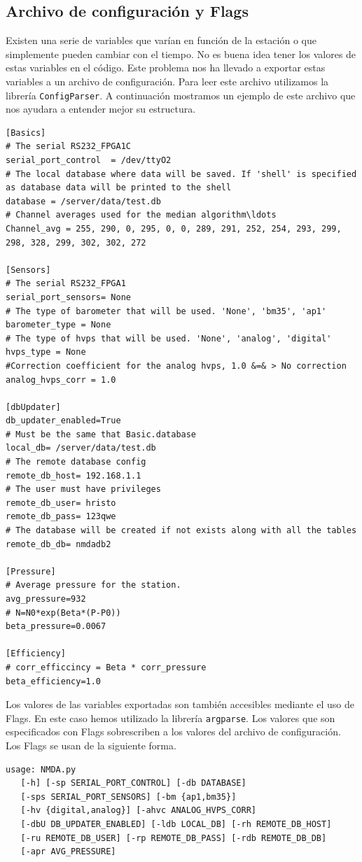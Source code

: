 	\subsection{Archivo de configuración y Flags}
		Existen una serie de variables que varían en función de la estación o que simplemente pueden cambiar con el tiempo. No es buena idea
		tener los valores de estas variables en el código. Este problema nos ha llevado a exportar estas variables a un archivo de configuración.
		Para leer este archivo utilizamos la librería \texttt{ConfigParser}\cite{py_ConfigParser}. A continuación mostramos un ejemplo de este
		archivo que nos ayudara a entender mejor su estructura.
		\begin{lstlisting}
[Basics]
# The serial RS232_FPGA1C
serial_port_control  = /dev/ttyO2
# The local database where data will be saved. If 'shell' is specified as database data will be printed to the shell
database = /server/data/test.db
# Channel averages used for the median algorithm\ldots
Channel_avg = 255, 290, 0, 295, 0, 0, 289, 291, 252, 254, 293, 299, 298, 328, 299, 302, 302, 272

[Sensors]
# The serial RS232_FPGA1
serial_port_sensors= None
# The type of barometer that will be used. 'None', 'bm35', 'ap1'
barometer_type = None
# The type of hvps that will be used. 'None', 'analog', 'digital'
hvps_type = None
#Correction coefficient for the analog hvps, 1.0 &=& > No correction
analog_hvps_corr = 1.0

[dbUpdater]
db_updater_enabled=True
# Must be the same that Basic.database
local_db= /server/data/test.db 
# The remote database config
remote_db_host= 192.168.1.1
# The user must have privileges
remote_db_user= hristo
remote_db_pass= 123qwe
# The database will be created if not exists along with all the tables
remote_db_db= nmdadb2

[Pressure]
# Average pressure for the station.
avg_pressure=932
# N=N0*exp(Beta*(P-P0))
beta_pressure=0.0067

[Efficiency]
# corr_efficcincy = Beta * corr_pressure
beta_efficiency=1.0
\end{lstlisting}
		Los valores de las variables exportadas son también accesibles mediante el uso de Flags. En este caso hemos utilizado la librería 
		\texttt{argparse}\cite{py_argparse}. Los valores que son especificados con Flags sobrescriben a los valores del archivo de
		configuración. Los Flags se usan de la siguiente forma.
		\begin{lstlisting}
usage: NMDA.py 
   [-h] [-sp SERIAL_PORT_CONTROL] [-db DATABASE]
   [-sps SERIAL_PORT_SENSORS] [-bm {ap1,bm35}]
   [-hv {digital,analog}] [-ahvc ANALOG_HVPS_CORR]
   [-dbU DB_UPDATER_ENABLED] [-ldb LOCAL_DB] [-rh REMOTE_DB_HOST]
   [-ru REMOTE_DB_USER] [-rp REMOTE_DB_PASS] [-rdb REMOTE_DB_DB]
   [-apr AVG_PRESSURE]
		\end{lstlisting}
